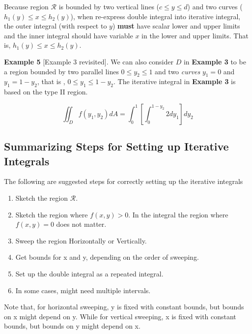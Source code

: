 \documentclass[
]{book}
\begin{document}
Because region \(\mathcal{R}\) is bounded by two vertical lines (\(c \le y \le d\)) and two curves (\(h_1(y) \le x \le h_2(y)\)), when re-express double integral into iterative integral, the outer integral (with respect to \(y\)) \textbf{must} have scalar lower and upper limits and the inner integral should have variable \(x\) in the lower and upper limits. That is, \(h_1(y) \le x \le h_2(y)\).

\hfill\break

\textbf{Example 5} {[}Example 3 revisited{]}. We can also consider \(D\) in \textbf{Example 3} to be a region bounded by two parallel lines \(0 \le y_2 \le 1\) and two \emph{curves} \(y_1 = 0\) and \(y_1 = 1 - y_2\), that is , \(0 \le y_1 \le 1 - y_2\). The iterative integral in \textbf{Example 3} is based on the type II region.

\[
\iint_D f(y_1,y_2)dA = \int_0^1 \left[ \int_0^{1-y_2}2 dy_1 \right] dy_2 
\]

\hfill\break

\hypertarget{summarizing-steps-for-setting-up-iterative-integrals}{%
\subsection{Summarizing Steps for Setting up Iterative Integrals}\label{summarizing-steps-for-setting-up-iterative-integrals}}

The following are suggested steps for correctly setting up the iterative integrals

\begin{enumerate}
\def\labelenumi{\arabic{enumi}.}
\item
  Sketch the region \(\mathcal{R}\).
\item
  Sketch the region where \(f(x, y) > 0\). In the integral the region where \(f(x, y) = 0\) does not matter.
\item
  Sweep the region Horizontally or Vertically.
\item
  Get bounds for x and y, depending on the order of sweeping.
\item
  Set up the double integral as a repeated integral.
\item
  In some cases, might need multiple intervals.
\end{enumerate}

Note that, for horizontal sweeping, y is fixed with constant bounds, but bounds on x might depend on y. While for vertical sweeping, x is fixed with constant bounds, but bounds on y might depend on x.
\end{document}
